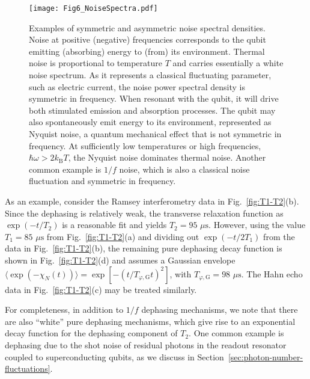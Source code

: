 \documentclass[aip,apr,twocolumn,showpacs,superscriptaddress,groupedaddress,nofootinbib,reprint]{revtex4-1}  %
\begin{document}
\begin{figure}[!t]
\centering
    \texttt{[image: Fig6\_NoiseSpectra.pdf]}
    \caption{Examples of symmetric and asymmetric noise spectral densities. Noise at positive (negative) frequencies corresponds to the qubit emitting (absorbing) energy to (from) its environment. Thermal noise is proportional to temperature $T$ and carries essentially a white noise spectrum. As it represents a classical fluctuating parameter, such as electric current, the noise power spectral density is symmetric in frequency. When resonant with the qubit, it will drive both stimulated emission and absorption processes. The qubit may also spontaneously emit energy to its environment, represented as Nyquist noise\cite{Nyquist1928}, a quantum mechanical effect that is not symmetric in frequency. At sufficiently low temperatures or high frequencies, $\hbar \omega > 2k_{\mathrm{B}}T$, the Nyquist noise dominates thermal noise. Another common example is $1/f$ noise, which is also a classical noise fluctuation and symmetric in frequency.}
\label{fig:noise-PSD}
\end{figure}

As an example, consider the Ramsey interferometry data in Fig.~\ref{fig:T1-T2}(b). Since the dephasing is relatively weak, the transverse relaxation function as $\exp(-t/T_2)$ is a reasonable fit and yields $T_2 = 95$ $\mu \mathrm{s}$. However, using the value $T_1 = 85$ $\mu \mathrm{s}$ from Fig.~\ref{fig:T1-T2}(a) and dividing out $\exp(-t/2T_1)$ from the data in Fig.~\ref{fig:T1-T2}(b), the remaining pure dephasing decay function is shown in Fig.~\ref{fig:T1-T2}(d) and assumes a Gaussian envelope $\langle \exp(- \chi_N(t)) \rangle = \exp \left[ -(t/T_{\varphi,\mathrm{G}} t)^2 \right]$, with $T_{\varphi,\mathrm{G}} = 98$ $\mu \textrm{s}$. The Hahn echo data in Fig.~\ref{fig:T1-T2}(c) may be treated similarly.

For completeness, in addition to $1/f$ dephasing mechanisms, we note that there are also ``white'' pure dephasing mechanisms, which give rise to an exponential decay function for the dephasing component of $T_2$. One common example is dephasing due to the shot noise of residual photons in the readout resonator coupled to superconducting qubits, as we discuss in Section~\ref{sec:photon-number-fluctuations}.
\end{document}
